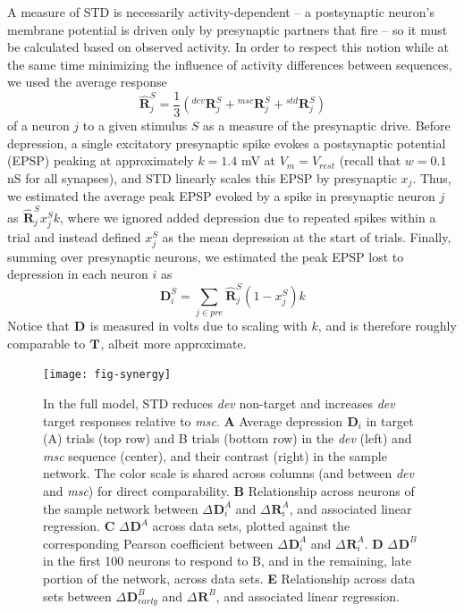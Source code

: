 \documentclass[9pt,lineno,onehalfspacing]{elife}
\newcommand{\dev}{\textit{dev}}
\newcommand{\msc}{\textit{msc}}
\newcommand{\R}[3][]{{}^{#1}_{}\boldsymbol R^{#2}_{#3}}
\newcommand{\T}[3][]{{}^{#1}_{}\boldsymbol T^{#2}_{#3}}
\newcommand{\D}[3][]{{}^{#1}_{}\boldsymbol D^{#2}_{#3}}
\newcommand{\Rhat}[3][]{{}^{#1}_{}\widehat{\boldsymbol R}^{#2}_{#3}}
\begin{document}
A measure of STD is necessarily activity-dependent -- a postsynaptic neuron's membrane potential is driven only by presynaptic partners that fire -- so it must be calculated based on observed activity. In order to respect this notion while at the same time minimizing the influence of activity differences between sequences, we used the average response
\begin{equation}
    \Rhat{S}{j} = \frac{1}{3} (\R[dev]{S}{j} + \R[msc]{S}{j} + \R[std]{S}{j}) \label{eq:Rhat}
\end{equation}
of a neuron $j$ to a given stimulus $S$ as a measure of the presynaptic drive. Before depression, a single excitatory presynaptic spike evokes a postsynaptic potential (EPSP) peaking at approximately $k = 1.4$ mV at $V_m = V_{rest}$ (recall that $w = 0.1$ nS for all synapses), and STD linearly scales this EPSP by presynaptic $x_j$. Thus, we estimated the average peak EPSP evoked by a spike in presynaptic neuron $j$ as $\Rhat{S}{j} x_j^S k$, where we ignored added depression due to repeated spikes within a trial and instead defined $x_j^S$ as the mean depression at the start of trials. Finally, summing over presynaptic neurons, we estimated the peak EPSP lost to depression in each neuron $i$ as
\begin{equation}
    \D{S}{i} = \sum_{j \in pre} \Rhat{S}{j} (1-x_j^S) k \label{eq:D}
\end{equation}
Notice that $\D{}{}$ is measured in volts due to scaling with $k$, and is therefore roughly comparable to $\T{}{}$, albeit more approximate.

\begin{figure}
    \texttt{[image: fig-synergy]}
    \caption{%
        In the full model, STD reduces \dev{} non-target and increases \dev{} target responses relative to \msc{}.
        \textbf{A} Average depression $\D{}{i}$ in target (A) trials (top row) and B trials (bottom row) in the \dev{} (left) and \msc{} sequence (center), and their contrast (right) in the sample network. The color scale is shared across columns (and between \dev{} and \msc{}) for direct comparability.
        \textbf{B} Relationship across neurons of the sample network between $\Delta \D{A}{i}$ and $\Delta \R{A}{i}$, and associated linear regression.
        \textbf{C} $\Delta \D{A}{}$ across data sets, plotted against the corresponding Pearson coefficient between $\Delta \D{A}{i}$ and $\Delta \R{A}{i}$.
        \textbf{D} $\Delta \D{B}{}$ in the first 100 neurons to respond to B, and in the remaining, late portion of the network, across data sets.
        \textbf{E} Relationship across data sets between $\Delta \D{B}{early}$ and $\Delta \R{B}{}$, and associated linear regression.
    }
    \label{fig:synergy}
\end{figure}
\end{document}
